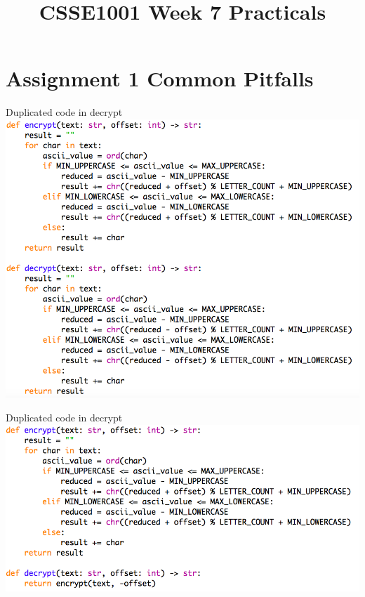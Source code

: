\documentclass[week2]{csse1001}
\title{CSSE1001 Week 7 Practicals}
\begin{document}
\begin{frame} 
\maketitle
\end{frame}

\section{Assignment 1 Common Pitfalls}

\begin{topic}{Duplicated code in decrypt}
\includegraphics[width=\textwidth]{a1pitfalls/baddecrypt}
\end{topic}

\begin{topic}{Duplicated code in decrypt}
\includegraphics[width=\textwidth]{a1pitfalls/gooddecrypt}
\end{topic}
\end{document}
